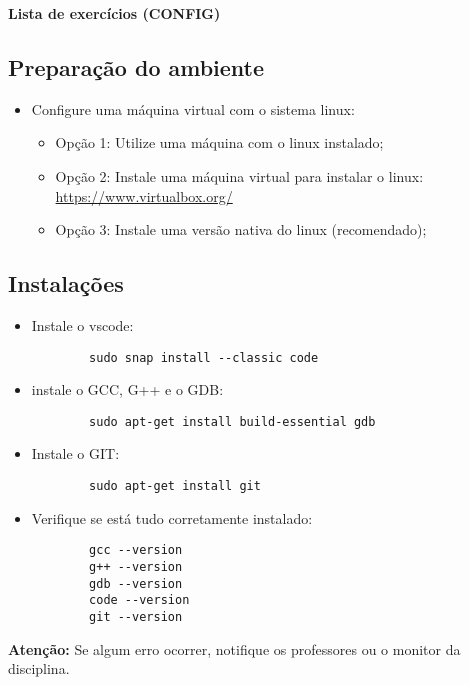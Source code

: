 \documentclass[12pt]{article}
\begin{document}
\begin{center}
    \LARGE \textbf{Lista de exercícios (CONFIG)}
\end{center}

\subsection*{Preparação do ambiente}
\begin{itemize}
    \item Configure uma máquina virtual com o sistema linux:
          \begin{itemize}
              \item Opção 1: Utilize uma máquina com o linux instalado;
              \item Opção 2: Instale uma máquina virtual para instalar o linux: \href{https://www.virtualbox.org/}{https://www.virtualbox.org/}
              \item Opção 3: Instale uma versão nativa do linux (recomendado);
          \end{itemize}
\end{itemize}

\subsection*{Instalações}
\begin{itemize}
    \item Instale o vscode:
          \begin{verbatim}
        sudo snap install --classic code
    \end{verbatim}
    \item instale o GCC, G++ e o GDB:
          \begin{verbatim}
        sudo apt-get install build-essential gdb
    \end{verbatim}
    \item Instale o GIT:
          \begin{verbatim}
        sudo apt-get install git
    \end{verbatim}
    \item Verifique se está tudo corretamente instalado:
          \begin{verbatim}
        gcc --version
        g++ --version
        gdb --version
        code --version
        git --version
    \end{verbatim}
\end{itemize}
\textbf{Atenção:}  Se algum erro ocorrer, notifique os professores ou o monitor da disciplina.
\end{document}

